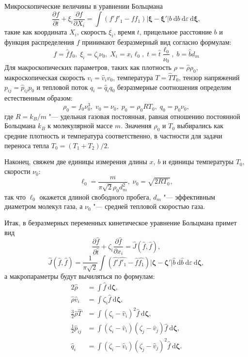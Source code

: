 \documentclass[english,russian,a4paper,12pt]{article}
\newcommand{\dd}{\:\mathrm{d}}
\begin{document}
Микроскопические величины в уравнении Больцмана
\[
    \frac{\partial{f}}{\partial{t}} + \xi_i\frac{\partial{f}}{\partial X_i} =
    \int (f'f'_1-ff_1)|\boldsymbol{\xi}-\boldsymbol{\xi}'|b\dd b \dd \varepsilon \boldsymbol{\dd\xi},
\]
такие как координата \(X_i\), скорость \(\xi_i\), время \(t\), прицельное расстояние \(b\)
и функция распределения \(f\) принимают безразмерный вид согласно формулам:
\[ f = \hat{f}f_0,\; \xi_i = \zeta_i\nu_0,\; X_i = x_i\ell_0,\;
    t = \hat{t}\frac{\ell_0}{\nu_0},\; b = \hat{b}d_m \]
Для макроскопических параметров, таких как плотность \( \rho = \hat{\rho}\rho_0\), макроскопическая скорость \(v_i = \hat{v}_iv_0\),
температура \(T = \hat{T}T_0\), тензор напряжений \(p_{ij} = \hat{p}_{ij}p_0\) и тепловой поток \(q_i = \hat{q}_iq_0\)
безразмерные соотношения определим естественным образом:
\[ \rho_0 = f_0 \nu_0^3, \; v_0 = \nu_0, \; p_0 = \rho_0RT_0, \; q_0 = p_0\nu_0, \]
где \(R = k_B/m\) "--- удельная газовая постоянная, равная отношению постоянной Больцмана \(k_B\) к молекулярной массе \(m\).
Значения \(\rho_0\) и \(T_0\) выбирались как средние плотность и температура соответственно,
в частности для задачи переноса тепла \(T_0 = (T_1+T_2)/2\).

Наконец, свяжем две единицы измерения длины \(x\), \(b\) и единицы температуры \(T_0\), скорости \(\nu_0\):
\[ \ell_0 = \frac{m}{\pi\sqrt2 \rho_0 d_m^2}, \; \nu_0 = \sqrt{2RT_0}, \]
так что \(\ell_0\) окажется длиной свободного пробега, \(d_m\) "--- эффективным диаметром молекул газа,
а \(\nu_0\) "--- средней тепловой скоростью газа.

Итак, в безразмерных переменных кинетическое уравнение Больцмана примет вид
\[ \frac{\partial\hat{f}}{\partial\hat{t}} + \zeta_i\frac{\partial\hat{f}}{\partial x_i} = \hat{J}(\hat{f},\hat{f}), \]
\[
    \hat{J}(\hat{f},\hat{f}) = \frac1{\pi\sqrt2}\int (\hat{f'}\hat{f'_1}-\hat{f}\hat{f_1})
    |\boldsymbol{\zeta}-\boldsymbol{\zeta}'| \hat{b}\dd \hat{b} \dd \varepsilon \boldsymbol{\dd\zeta},
\]
а макропараметры будут вычиляться по формулам:
\begin{alignat*}{2}
    \hat{\rho} &= \int \hat{f}\boldsymbol{\dd\zeta}, \\
    \hat{\rho}\hat{v}_i &= \int \zeta_i \hat{f}\boldsymbol{\dd\zeta}, \\
    \frac3{2}\hat{\rho}\hat{T} &= \int(\zeta_i-\hat{v}_i)^2\hat{f}\boldsymbol{\dd\zeta}, \\
    \frac1{2}\hat{p}_{ij} &= \int(\zeta_i-\hat{v}_i)(\zeta_j-\hat{v}_j)\hat{f}\boldsymbol{\dd\zeta}, \\
    \hat{q}_i &= \int(\zeta_i-\hat{v}_i)(\zeta_j-\hat{v}_j)^2\hat{f}\boldsymbol{\dd\zeta}.
\end{alignat*}
\end{document}
